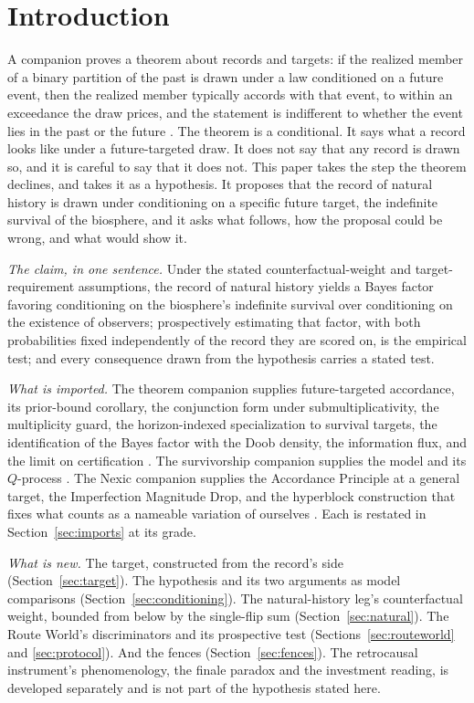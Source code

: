 \section{Introduction}\label{sec:intro}

A companion proves a theorem about records and targets: if the realized
member of a binary partition of the past is drawn under a law conditioned
on a future event, then the realized member typically accords with that
event, to within an exceedance the draw prices, and the statement is
indifferent to whether the event lies in the past or the future
\cite{GoldenTargeted}. The theorem is a conditional. It says what a record
looks like under a future-targeted draw. It does not say that any record
is drawn so, and it is careful to say that it does not. This paper takes
the step the theorem declines, and takes it as a hypothesis. It proposes
that the record of natural history is drawn under conditioning on a
specific future target, the indefinite survival of the biosphere, and it
asks what follows, how the proposal could be wrong, and what would show
it.

\emph{The claim, in one sentence.} Under the stated
counterfactual-weight and target-requirement assumptions, the record of
natural history yields a Bayes factor favoring conditioning on the
biosphere's indefinite survival over conditioning on the existence of
observers; prospectively estimating that factor, with both probabilities
fixed independently of the record they are scored on, is the empirical
test; and every consequence drawn from the hypothesis carries a stated
test.

\emph{What is imported.} The theorem companion supplies future-targeted
accordance, its prior-bound corollary, the conjunction form under
submultiplicativity, the multiplicity guard, the horizon-indexed
specialization to survival targets, the identification of the Bayes factor
with the Doob density, the information flux, and the limit on
certification \cite{GoldenTargeted}. The survivorship companion supplies the
model and its $Q$-process \cite{GoldenSurvivorship}. The Nexic companion supplies the
Accordance Principle at a general target, the Imperfection Magnitude Drop,
and the hyperblock construction that fixes what counts as a nameable
variation of ourselves \cite{Nexus}. Each is restated in
Section~\ref{sec:imports} at its grade.

\emph{What is new.} The target, constructed from the record's side
(Section~\ref{sec:target}). The hypothesis and its two arguments as model
comparisons (Section~\ref{sec:conditioning}). The natural-history leg's counterfactual weight, bounded from below by the single-flip sum (Section~\ref{sec:natural}). The Route World's discriminators and its prospective test (Sections~\ref{sec:routeworld} and \ref{sec:protocol}). And the fences (Section~\ref{sec:fences}). The retrocausal instrument's phenomenology, the finale paradox and the investment reading, is developed separately and is not part of the hypothesis stated here.


